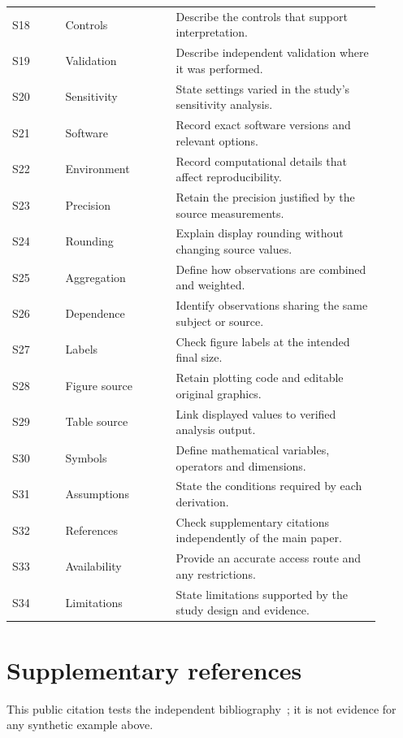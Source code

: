 \documentclass[11pt,a4paper]{article}
\begin{document}
\begin{longtable}{@{}p{0.13\linewidth}p{0.27\linewidth}p{0.50\linewidth}@{}}
S18 & Controls & Describe the controls that support interpretation.\\
S19 & Validation & Describe independent validation where it was performed.\\
S20 & Sensitivity & State settings varied in the study's sensitivity analysis.\\
S21 & Software & Record exact software versions and relevant options.\\
S22 & Environment & Record computational details that affect reproducibility.\\
S23 & Precision & Retain the precision justified by the source measurements.\\
S24 & Rounding & Explain display rounding without changing source values.\\
S25 & Aggregation & Define how observations are combined and weighted.\\
S26 & Dependence & Identify observations sharing the same subject or source.\\
S27 & Labels & Check figure labels at the intended final size.\\
S28 & Figure source & Retain plotting code and editable original graphics.\\
S29 & Table source & Link displayed values to verified analysis output.\\
S30 & Symbols & Define mathematical variables, operators and dimensions.\\
S31 & Assumptions & State the conditions required by each derivation.\\
S32 & References & Check supplementary citations independently of the main paper.\\
S33 & Availability & Provide an accurate access route and any restrictions.\\
S34 & Limitations & State limitations supported by the study design and evidence.\\
\end{longtable}
\normalsize

\section{Supplementary references}
This public citation tests the independent bibliography~\citep{wilkinson2016fair};
it is not evidence for any synthetic example above.


\end{document}
